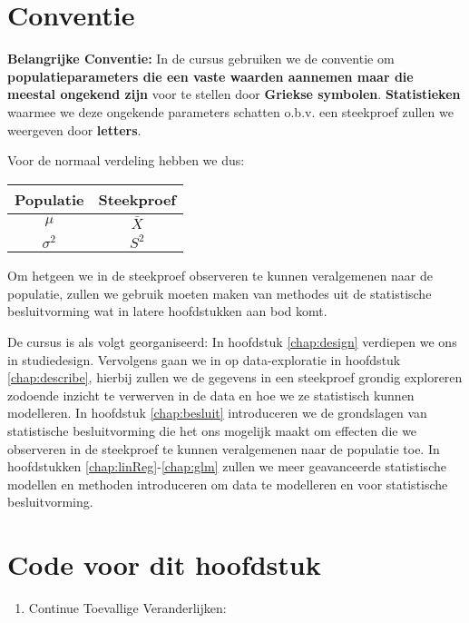 \documentclass[
  12pt,dutch,coursenotes]{book}
\providecommand{\tightlist}{%
  \setlength{\itemsep}{0pt}\setlength{\parskip}{0pt}}
\theoremstyle{definition}
\theoremstyle{definition}
\theoremstyle{definition}
\theoremstyle{remark}
\begin{document}
\hypertarget{conventie}{%
\section{Conventie}\label{conventie}}

\textbf{Belangrijke Conventie:} In de cursus gebruiken we de conventie om \textbf{populatieparameters die een vaste waarden aannemen maar die meestal ongekend zijn} voor te stellen door \textbf{Griekse symbolen}. \textbf{Statistieken} waarmee we deze ongekende parameters schatten o.b.v. een steekproef zullen we weergeven door \textbf{letters}.

Voor de normaal verdeling hebben we dus:

\begin{longtable}[]{@{}cc@{}}
\toprule
Populatie & Steekproef\tabularnewline
\midrule
\endhead
\(\mu\) & \(\bar X\)\tabularnewline
\(\sigma^2\) & \(S^2\)\tabularnewline
\bottomrule
\end{longtable}

Om hetgeen we in de steekproef observeren te kunnen veralgemenen naar de populatie, zullen we gebruik moeten maken van methodes uit de statistische besluitvorming wat in latere hoofdstukken aan bod komt.

De cursus is als volgt georganiseerd:
In hoofdstuk \ref{chap:design} verdiepen we ons in studiedesign. Vervolgens gaan we in op data-exploratie in hoofdstuk \ref{chap:describe}, hierbij zullen we de gegevens in een steekproef grondig exploreren zodoende inzicht te verwerven in de data en hoe we ze statistisch kunnen modelleren.
In hoofdstuk \ref{chap:besluit} introduceren we de grondslagen van statistische besluitvorming die het ons mogelijk maakt om effecten die we observeren in de steekproef te kunnen veralgemenen naar de populatie toe.
In hoofdstukken \ref{chap:linReg}-\ref{chap:glm} zullen we meer geavanceerde statistische modellen en methoden introduceren om data te modelleren en voor statistische besluitvorming.

\hypertarget{code-voor-dit-hoofdstuk}{%
\section{Code voor dit hoofdstuk}\label{code-voor-dit-hoofdstuk}}

\begin{enumerate}
\def\labelenumi{\arabic{enumi}.}
\tightlist
\item
  Continue Toevallige Veranderlijken:
\end{enumerate}
\end{document}
